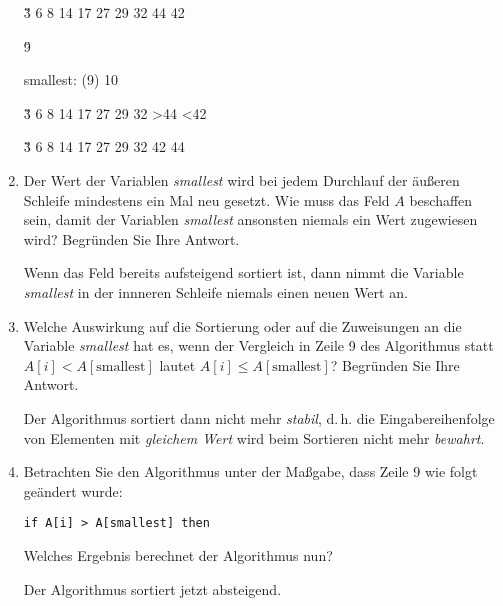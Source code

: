 \documentclass{lehramt-informatik-aufgabe}
\begin{document}
\begin{enumerate}
\begin{liAntwort}
\v{3 6 8 14 17 27 29 32 44 42}

%

\u{9}

smallest: (9) 10

\v{3 6 8 14 17 27 29 32 >44 <42}

%


\v{3 6 8 14 17 27 29 32 42 44}

\end{liAntwort}

%

\item Der Wert der Variablen \emph{smallest} wird bei jedem Durchlauf
der äußeren Schleife mindestens ein Mal neu gesetzt. Wie muss das Feld
$A$ beschaffen sein, damit der Variablen \emph{smallest} ansonsten
niemals ein Wert zugewiesen wird? Begründen Sie Ihre Antwort.

\begin{liAntwort}
Wenn das Feld bereits aufsteigend sortiert ist, dann nimmt die Variable
\emph{smallest} in der innneren Schleife niemals einen neuen Wert an.
\end{liAntwort}

%

\item Welche Auswirkung auf die Sortierung oder auf die Zuweisungen an
die Variable \emph{smallest} hat es, wenn der Vergleich in Zeile 9 des
Algorithmus statt $A[i] < A[\text{smallest}]$ lautet $A[i] \leq
A[\text{smallest}]$? Begründen Sie Ihre Antwort.

\begin{liAntwort}
Der Algorithmus sortiert dann nicht mehr \emph{stabil}, d.\,h. die
Eingabereihenfolge von Elementen mit \emph{gleichem Wert} wird beim
Sortieren nicht mehr \emph{bewahrt}.
\end{liAntwort}

%

\item Betrachten Sie den Algorithmus unter der Maßgabe, dass Zeile 9 wie
folgt geändert wurde:

\begin{verbatim}
if A[i] > A[smallest] then
\end{verbatim}

Welches Ergebnis berechnet der Algorithmus nun?

\begin{liAntwort}
Der Algorithmus sortiert jetzt absteigend.
\end{liAntwort}


\end{enumerate}
\end{document}
